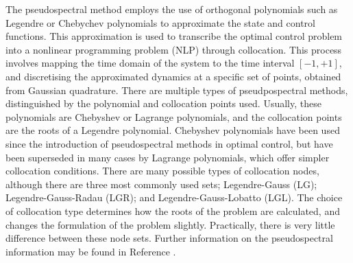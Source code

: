 The pseudospectral method employs the use of orthogonal polynomials such as Legendre or Chebychev polynomials to approximate the state and control functions.
This approximation is used to transcribe the optimal control problem into a nonlinear programming problem (NLP) through collocation. This process involves mapping the time domain of the system to the time interval $[-1,+1]$, and discretising the approximated dynamics at a specific set of points, obtained from Gaussian quadrature\cite{Fahroo2000,Huntington2007,Kelly2015,Rao2009,Garg2011}. 
There are multiple types of pseudpospectral methods, distinguished by the polynomial and collocation points used. Usually, these polynomials are Chebyshev or Lagrange polynomials\cite{Fahroo2000,Rao2009}, and the collocation points are the roots of a Legendre polynomial\cite{Garg2009}. Chebyshev polynomials have been used since the introduction of pseudospectral methods in optimal control, but have been superseded in many cases by Lagrange polynomials, which offer simpler collocation conditions\cite{Rao2009}. 
There are many possible types of collocation nodes, although there are three most commonly used sets; Legendre-Gauss (LG); Legendre-Gauss-Radau (LGR); and Legendre-Gauss-Lobatto (LGL)\cite{Garg2009,Rao2009}. The choice of collocation type determines how the roots of the problem are calculated, and changes the formulation of the problem slightly\cite{Garg2009}. Practically, there is very little difference between these node sets\cite{Garg2009}.
Further information on the pseudospectral information may be found in Reference \cite{Huntington2007}.


